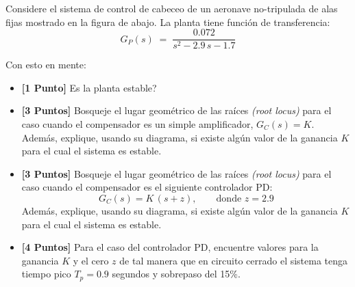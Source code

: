 \documentclass[ a4paper, twoside, 11pt]{article}
\begin{document}
\begin{problem}
Considere el sistema de control de cabeceo de un aeronave no-tripulada de alas fijas mostrado en la figura de abajo. La planta tiene funci\'on de transferencia: 
\[
G_P(s) \; = \; \frac{0.072}{ s^2 - 2.9 \, s - 1.7 }
\]

\begin{figure}[htb]
\centering
\def\svgwidth{0.8\columnwidth}

\end{figure}

Con esto en mente: 
\begin{itemize}
\item \textbf{[1 Punto]} Es la planta estable?
\item \textbf{[3 Puntos]} Bosqueje el lugar geom\'etrico de las ra\'ices \emph{(root locus)} para el caso cuando el compensador es un simple amplificador, \ie $G_C(s) = K$. Adem\'as, explique, usando su diagrama, si existe alg\'un valor de la ganancia $K$ para el cual el sistema es estable. 
\item \textbf{[3 Puntos]} Bosqueje el lugar geom\'etrico de las ra\'ices \emph{(root locus)} para el caso cuando el compensador es el siguiente controlador PD: 
\[
G_C(s) = K \, ( s + z ), \qquad \text{donde } z = 2.9
\]
Adem\'as, explique, usando su diagrama, si existe alg\'un valor de la ganancia $K$ para el cual el sistema es estable. 
\item \textbf{[4 Puntos]} Para el caso del controlador PD, encuentre valores para la ganancia $K$ y el cero $z$ de tal manera que en circuito cerrado el sistema tenga tiempo pico $T_p = 0.9$ segundos y sobrepaso del 15\%. 

\end{itemize}

\end{problem}
\vspace{\baselineskip}
\end{document}
